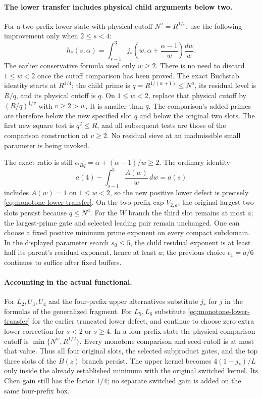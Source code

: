\documentclass[11pt]{article}
\begin{document}
\paragraph{The lower transfer includes physical child arguments below two.}
For a two-prefix lower state with physical cutoff $N^a=R^{1/s}$,
use the following improvement only when $2\le s<4$:
\begin{equation}\label{eq:monotone-lower-transfer}
 h_*(s,\alpha)=\int_{s-1}^3
    j_*\left(w,\alpha+\frac{\alpha-1}{w}\right)\frac{dw}{w}.
\end{equation}
The earlier conservative formula used only $w\ge2$. There is no
need to discard $1\le w<2$ once the cutoff comparison has been
proved. The exact Buchstab identity starts at $R^{1/4}$; the child
prime is $q=R^{1/(w+1)}\le N^a$, its residual level is $R/q$, and
its physical cutoff is $q$. On $1\le w<2$, replace that physical
cutoff by $(R/q)^{1/v}$ with $v\ge2>w$. It is smaller than $q$.
The comparison's added primes are therefore below the new specified
slot $q$ and below the original two slots. The first new square test
is $q^2\le R$, and all subsequent tests are those of the comparison
construction at $v\ge2$. No residual sieve at an inadmissible small
parameter is being invoked.

The exact ratio is still
$\alpha_{Bq}=\alpha+(\alpha-1)/w\ge2$. The ordinary identity
\[
 a(4)-\int_{s-1}^3\frac{A(w)}w\,dw=a(s)
\]
includes $A(w)=1$ on $1\le w<2$, so the new positive lower defect
is precisely \eqref{eq:monotone-lower-transfer}. On the two-prefix
cap $V_{2,a}$, the original largest two slots persist because
$q\le N^a$. For the $W$ branch the third slot remains at most $a$;
the largest-prime gate and selected leading pair remain unchanged.
One can choose a fixed positive minimum prime exponent on every
compact subdomain. In the displayed parameter search $s_0\le5$,
the child residual exponent is at least half its parent's residual
exponent, hence at least $a$; the previous choice $\epsilon_1=a/6$
continues to suffice after fixed buffers.

\paragraph{Accounting in the actual functional.}
For $L_2,U_3,U_4$ and the four-prefix upper alternatives substitute
$j_*$ for $j$ in the formulas of the generalized fragment.
For $L_5,L_6$ substitute \eqref{eq:monotone-lower-transfer} for the
earlier truncated lower defect, and continue to choose zero extra
lower correction for $s<2$ or $s\ge4$.
In a four-prefix state the physical comparison cutoff is
$\min\{N^w,R^{1/2}\}$. Every monotone comparison and seed cutoff
is at most that value. Thus all four original slots, the selected
subproduct gates, and the top three slots of the $B(z)$ branch
persist. The upper kernel becomes $4(1-j_*)/L$ only inside the
already established minimum with the original switched kernel.
Its Chen gain still has the factor $1/4$; no separate switched gain
is added on the same four-prefix box.
\end{document}
